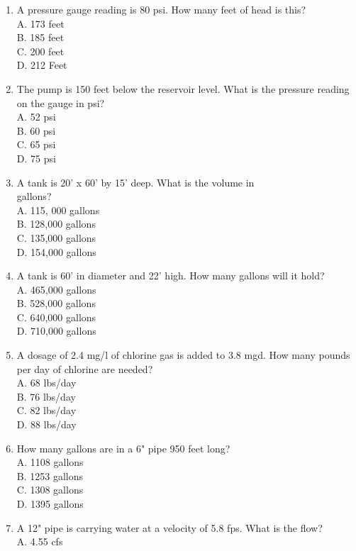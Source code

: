 \begin{enumerate}
\item A pressure gauge reading is 80 psi. How many feet of head is this?\\
A. 173 feet\\
B. 185 feet\\
C. 200 feet\\
D. 212 Feet\\
\item The pump is 150 feet below the reservoir level. What is the pressure reading on the gauge in psi?\\
A. 52 psi\\
B. 60 psi\\
C. 65 psi\\
D. 75 psi\\
\item A tank is 20' x 60' by 15' deep. What is the volume in\\
gallons?\\
A. 115, 000 gallons\\
B. 128,000 gallons\\
C. 135,000 gallons\\
D. 154,000 gallons\\
\item A tank is 60' in diameter and 22' high. How many gallons will it hold?\\
A. 465,000 gallons\\
B. 528,000 gallons\\
C. 640,000 gallons\\
D. 710,000 gallons\\
\item A dosage of 2.4 mg/l of chlorine gas is added to 3.8 mgd. How many pounds per day of chlorine are needed?\\
A. 68 lbs/day\\
B. 76 lbs/day\\
C. 82 lbs/day\\
D. 88 lbs/day\\
\item How many gallons are in a 6" pipe 950 feet long?\\
A. 1108 gallons\\
B. 1253 gallons\\
C. 1308 gallons\\
D. 1395 gallons\\
\item A 12" pipe is carrying water at a velocity of 5.8 fps. What is the flow?\\
A. 4.55 cfs\\

\end{enumerate}

